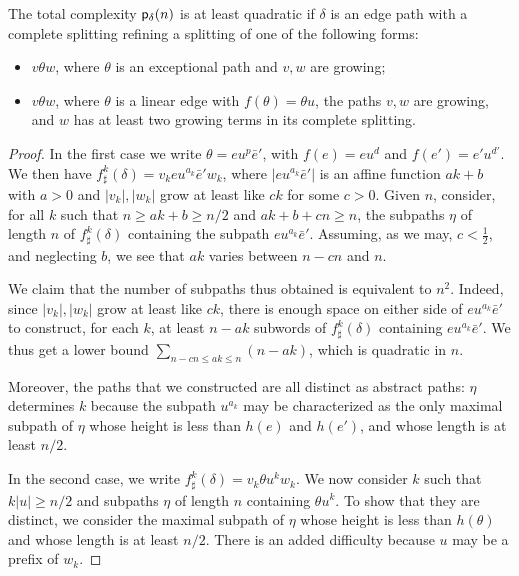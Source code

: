 \documentclass[10pt,a4paper]{amsart}
\newcommand{\cp}{{\sf  p}}
\renewcommand{\label}[1]{}
\begin{document}
\begin{lem} \label{entour}
The total complexity $\cp_\delta(n)$ is at least quadratic 
if $\delta$ is an edge path with a complete splitting refining a splitting of one of the following forms:
\begin{itemize}
\item  
  $v\theta w$, where $\theta$ is an exceptional path and $v,w$ are growing;
  \item $v\theta w$, where $\theta$ is a linear edge with $f(\theta)=\theta u$,   the paths  $v,w$ are growing, and $w$ has at least two growing terms in its complete splitting.
\end{itemize}
\end{lem}

\begin{proof}
In the first case we write  $\theta=eu^p\bar e'$, with $f(e)=eu^d$ and $f(e')=e'u^{d'}$.
We then have  $f^k_\sharp(\delta)=v_keu^{a_k}\bar e'w_k$, where $ | eu^{a_k}\bar e' | $ is an affine function $ak+b$  with $a>0$ and   $ | v_k | , | w_k | $  grow at least like $ck$ for some $c>0$. Given $n$, consider, for all $k$ such that $n\ge ak+b\ge n/2$ and $ ak+b+cn \ge n$, 
the subpaths $\eta$ of length $n$ of $f^k_\sharp(\delta)$ containing the subpath $eu^{a_k}\bar e'$. Assuming, as we may, $c<\frac12$, and neglecting $b$, we see that $ak$ varies between $n-cn$ and $n$.

 We claim that the number of subpaths thus obtained is equivalent to $n^2$.    
 Indeed, since $ | v_k | , | w_k | $ grow at least like $ck$, there is enough space on either side of $eu^{a_k}\bar e'$  to construct, for each $k$, at least $n-ak$ subwords of $f^k_\sharp(\delta)$ containing $eu^{a_k}\bar e'$.  We thus get  a lower bound $\displaystyle\sum_{   {n-cn}\le ak\le{  n}}(n-ak) $, which is quadratic in $n$.




 Moreover,
%
the paths that we constructed are all distinct as abstract paths: $\eta$ determines $k$  because the subpath $u^{a_k}$ may be characterized as the only maximal subpath   of $\eta$ whose height   is less than $h(e)$ and $h(e')$, and whose length is at least $n/2$.   

 In the second case, we write $f^k_\sharp(\delta)=v_k\theta u^{ k} w_k$. We now consider $k$ such that $k | u | \ge n/2$ and subpaths $\eta$ of length $n$ containing $\theta u^k$. To show that they are distinct, we consider the maximal subpath   of $\eta$ whose height   is less than $h(\theta)$ and whose length is at least $n/2$. There is an added difficulty 
 because $u$ may be a prefix of $w_k$. 
 

\end{proof}
\end{document}
